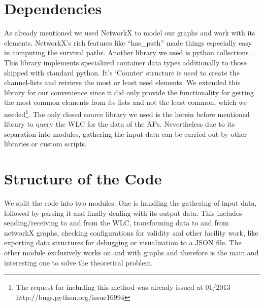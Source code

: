   \section{Dependencies}
    As already mentioned we used NetworkX \cite{hagberg-2008-exploring} to model our graphs and work with its elements.
    NetworkX's rich features like ``has\_path'' made things especially easy in computing the survival paths.
    Another library we used is python collections \cite{python_collections}.
    This library implements specialized container data types additionally to those shipped with standard python.
    It's `Counter` structure is used to create the channel-lists and retrieve the most or least used elements.
    We extended this library for our convenience since it did only provide the functionality for getting the most common elements from its lists and not the least common,
    which we needed\footnote{The request for including this method was already issued at 01/2013 http://bugs.python.org/issue16994}.
    The only closed source library we used is the herein before mentioned library to query the WLC for the data of the APs. 
    Nevertheless due to its separation into modules, gathering the input-data can be carried out by other libraries or custom scripts.
  
  \section{Structure of the Code}
    We split the code into two modules. One is handling the gathering of input data, followed by parsing it and finally dealing with its output data.
    This includes sending/receiving to and from the \ac{WLC}, transforming data to and from networkX graphs, checking configurations for validity and other facility work,
    like exporting data structures for debugging or visualization to a \ac{JSON} file.
    The other module exclusively works on and with graphs and therefore is the main and interesting one to solve the theoretical problem.
    
